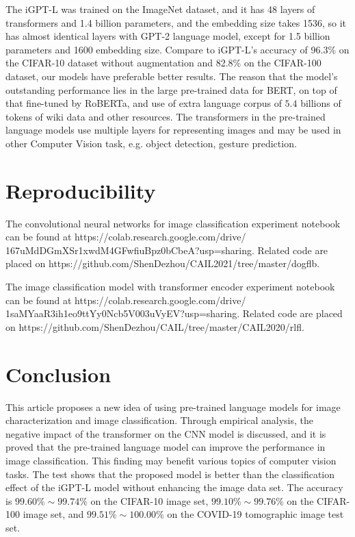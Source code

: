 \documentclass[runningheads]{llncs}
\begin{document}
The iGPT-L was trained on the ImageNet dataset, and it has 48 layers of transformers and 1.4 billion parameters, and the embedding size takes 1536,
so it has almost identical layers with GPT-2 language model, except for 1.5 billion parameters and 1600 embedding size.
Compare to iGPT-L's accuracy of 96.3\% on the CIFAR-10 dataset without augmentation and 82.8\% on the CIFAR-100 dataset, our models have preferable better results.
The reason that the model's outstanding performance lies in the large pre-trained data for BERT, on top of that fine-tuned by RoBERTa, and use of extra language corpus of
$5.4$ billions of tokens of wiki data and other resources.
The transformers in the pre-trained language models use multiple layers for representing images and may be used in other Computer Vision task, e.g. object detection, gesture prediction.

\section{Reproducibility}

The convolutional neural networks for image classification experiment notebook can be found at https://colab.research.google.com/drive/\\
167uMdDGmXSr1xwdM4GFwfiuBpz0bCbeA?usp=sharing. Related code are placed on https://github.com/ShenDezhou/CAIL2021/tree/master/dogflb.

The image classification model with transformer encoder experiment notebook can be found at https://colab.research.google.com/drive/\\
1saMYaaR3ih1eo9ttYy0Ncb5V003uVyEV?usp=sharing. Related code are placed on https://github.com/ShenDezhou/CAIL/tree/master/CAIL2020/rlfl.



\section{Conclusion}

This article proposes a new idea of using pre-trained language models for image characterization and image classification.
Through empirical analysis, the negative impact of the transformer on the CNN model is discussed, and it is proved that the pre-trained language model can improve the performance in image classification.
This finding may benefit various topics of computer vision tasks.
The test shows that the proposed model is better than the classification effect of the iGPT-L model without enhancing the image data set.
The accuracy is $99.60\%\sim99.74\%$ on the CIFAR-10 image set, $99.10\%\sim99.76\%$ on the CIFAR-100 image set, and $99.51\%\sim100.00\%$ on the COVID-19 tomographic image test set.

%
%
%
% 
% 
%
{\small



}
\end{document}
